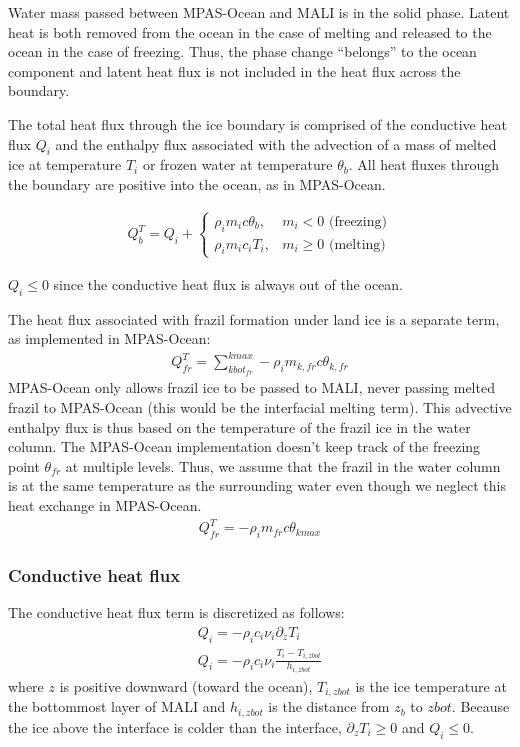 \documentclass[11pt]{report}
\newcommand{\bea}{\begin{eqnarray}}
\newcommand{\eea}{\end{eqnarray}}
\begin{document}
Water mass passed between MPAS-Ocean and MALI is in the solid phase. Latent heat  is both removed from the ocean in the case of melting and released to the ocean in the case of freezing. Thus, the phase change ``belongs'' to the ocean component and latent heat flux is not included in the heat flux across the boundary.

The total heat flux through the ice boundary is comprised of the conductive heat flux $Q_i$ and the enthalpy flux associated with the advection of a mass of melted ice at temperature $T_i$ or frozen water at temperature $\theta_b$.  All heat fluxes through the boundary are positive into the ocean, as in MPAS-Ocean.

\bea
    Q_b^T = Q_i +
    \begin{cases}
        \rho_i m_i c \theta_b, &m_i < 0 \text{ (freezing)}\\
        \rho_i m_i c_i T_i, &m_i \ge 0 \text{ (melting)}
    \end{cases}
    \label{eq:heat_flux}
\eea

$Q_i \le 0$ since the conductive heat flux is always out of the ocean.

The heat flux associated with frazil formation under land ice is a separate term, as implemented in MPAS-Ocean:
\bea
    Q_{fr}^T = \sum_{kbot_{fr}}^{kmax} -\rho_i m_{k,fr} c \theta_{k,fr}
\eea
MPAS-Ocean only allows frazil ice to be passed to MALI, never passing melted frazil to MPAS-Ocean (this would be the interfacial melting term). This advective enthalpy flux is thus based on the temperature of the frazil ice in the water column. The MPAS-Ocean implementation doesn't keep track of the freezing point $\theta_{fr}$ at multiple levels. Thus, we assume that the frazil in the water column is at the same temperature as the surrounding water even though we neglect this heat exchange in MPAS-Ocean.
\bea
    Q_{fr}^T = -\rho_i m_{fr} c \theta_{kmax}
\eea

\subsubsection{Conductive heat flux}

The conductive heat flux term is discretized as follows:
\bea
    Q_i = -\rho_i c_i \nu_i \partial_z T_i\\
    Q_i = -\rho_i c_i \nu_i \frac{T_i - T_{i,zbot}}{h_{i,zbot}}
\eea
where $z$ is positive downward (toward the ocean), $T_{i,zbot}$ is the ice temperature at the bottommost layer of MALI and $h_{i,zbot}$ is the distance from $z_b$ to $zbot$.  Because the ice above the interface is colder than the interface, $\partial_z T_i \ge 0$ and $Q_i \le 0$.
\end{document}

